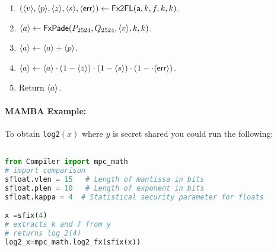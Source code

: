 \begin{enumerate}
\item $(\langle v \rangle,\langle p \rangle,\langle z \rangle,\langle s \rangle,\langle \mathsf{err} \rangle)
	\leftarrow \mathsf{Fx2FL}(\mathsf{a},k,f,k,k)$.
\item $\langle a \rangle \leftarrow \mathsf{FxPade}(P_{2524},Q_{2524},\langle v \rangle,k,k)$.
\item $\langle a \rangle \leftarrow \langle a \rangle+\langle p \rangle$.
\item $\langle a \rangle \leftarrow \langle a \rangle \cdot (1-\langle z \rangle) \cdot (1-\langle s \rangle) \cdot (1-\cdot \langle \mathsf{err} \rangle)$.
\item Return $\langle a \rangle$.
\end{enumerate}

\paragraph{MAMBA Example:} To obtain \verb|log2|$(x)$ where $y$ is secret shared you could run the following: 
\begin{lstlisting}[language={python}]

from Compiler import mpc_math
# import comparison
sfloat.vlen = 15   # Length of mantissa in bits
sfloat.plen = 10   # Length of exponent in bits
sfloat.kappa = 4  # Statistical security parameter for floats

x =sfix(4)
# extracts k and f from y
# returns log_2(4) 
log2_x=mpc_math.log2_fx(sfix(x))
\end{lstlisting}


